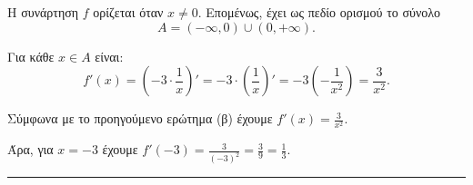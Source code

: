 \begin{alist}
    \item Η συνάρτηση $f$ ορίζεται όταν $x \neq 0$. Επομένως, έχει ως πεδίο ορισμού το σύνολο
    \[ A = (-\infty, 0) \cup (0, +\infty). \]

    \item Για κάθε $x \in A$ είναι:
    \[ f'(x) = \left(-3 \cdot \frac{1}{x}\right)' = -3 \cdot \left(\frac{1}{x}\right)' = -3 \left(-\frac{1}{x^2}\right) = \frac{3}{x^2}. \]

    \item Σύμφωνα με το προηγούμενο ερώτημα (β) έχουμε $f'(x) = \frac{3}{x^2}$.

    Άρα, για $x=-3$ έχουμε $f'(-3) = \frac{3}{(-3)^2} = \frac{3}{9} = \frac{1}{3}$.
\end{alist}
\vspace{6mm}
\noindent\rule{\textwidth}{0.4pt}
\vspace{6mm}


